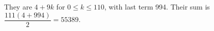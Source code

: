 They are $4+9k$ for $0\le k\le110$, with last term 994. Their sum is $\dfrac{111(4+994)}{2}=\boxed{55389}$.
